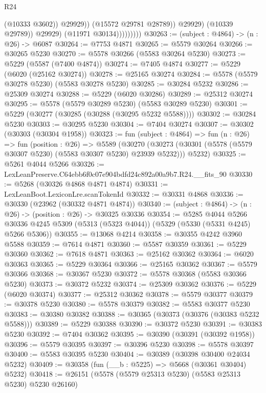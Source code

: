 \begin{lexlean}{R24}
\begin{coremodule}
                                  (@10333 @3602))
                                @29929))
                            (@15572 @29781 @28789))
                          @29929)
                        (@10339 @29789))
                      @29929)
                    (@11971 @30134)))))))))
@30263 := (subject : @4864) -> (n : @26) -> @6087
@30264 := @7753 @4871
@30265 := @5579 @30264
@30266 := @30265 @5230
@30270 := @5578 @30266 (@5583 @30264 @5230)
@30273 := @5229 (@5587 (@7400 @4874))
@30274 := @7405 @4874
@30277 := @5229 (@6020 (@25162 @30274))
@30278 := @25165 @30274
@30284 := @5578 (@5579 @30278 @5230) (@5583 @30278 @5230)
@30285 := @30284 @5232
@30286 := @25309 @30274
@30288 := @5229 (@6020 @30286)
@30289 := @25312 @30274
@30295 := @5578 (@5579 @30289 @5230) (@5583 @30289 @5230)
@30301 := @5229 (@30277 (@30285 (@30288 (@30295 @5232 @5588))))
@30302 := @30284 @5230
@30303 := @30295 @5230
@30304 := @7404 @30274
@30307 := @30302 (@30303 (@30304 @1958))
@30323 := fun (subject : @4864) =>
  fun (n : @26) =>
  fun (position : @26) =>
  @5589
    (@30270 (@30273 (@30301 (@5578 (@5579 @30307 @5230) (@5583 @30307 @5230) @23939 @5232))) @5232)
@30325 := @5261 @4044 @5266
@30326 := LexLeanPreserve.C64ebb6f0c07e904bdfd24c892a00a9b7.R24.__fits_90
@30330 := @5268 (@30326 @4868 @4871 @4874)
@30331 := LexLeanBoot.LexiconLre.scanTokenId
@30332 := @30331 @4868
@30336 := @30330 (@23962 (@30332 @4871 @4874))
@30340 := (subject : @4864) -> (n : @26) -> (position : @26) -> @30325 @30336
@30354 := @5285
    @4044
    @5266
    @30336
    @4245
    @5309
    (@5313 (@5323 @4044))
    (@5329 (@5330 (@5331 @4245) @5266 @5306))
@30355 := @13068 @4214
@30358 := @30355 @4242 @3960 @5588
@30359 := @7614 @4871
@30360 := @5587 @30359
@30361 := @5229 @30360
@30362 := @7618 @4871
@30363 := @25162 @30362
@30364 := @6020 @30363
@30365 := @5229 @30364
@30366 := @25165 @30362
@30367 := @5579 @30366
@30368 := @30367 @5230
@30372 := @5578 @30368 (@5583 @30366 @5230)
@30373 := @30372 @5232
@30374 := @25309 @30362
@30376 := @5229 (@6020 @30374)
@30377 := @25312 @30362
@30378 := @5579 @30377
@30379 := @30378 @5230
@30380 := @5578 @30379
@30382 := @5583 @30377 @5230
@30383 := @30380 @30382
@30388 := @30365 (@30373 (@30376 (@30383 @5232 @5588)))
@30389 := @5229 @30388
@30390 := @30372 @5230
@30391 := @30383 @5230
@30392 := @7404 @30362
@30395 := @30390 (@30391 (@30392 @1958))
@30396 := @5579 @30395
@30397 := @30396 @5230
@30398 := @5578 @30397
@30400 := @5583 @30395 @5230
@30404 := @30389 (@30398 @30400 @24034 @5232)
@30409 := @30358 (fun (__b : @5225) => @5668 (@30361 @30404) @5232)
@30418 := @26151 (@5578 (@5579 @25313 @5230) (@5583 @25313 @5230) @5230 @26160)

\end{coremodule}
\end{lexlean}
